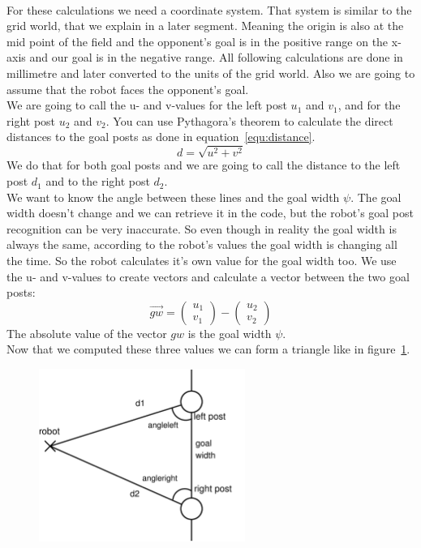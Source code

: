 \documentclass[lnicst,a4paper]{svmultln}
\begin{document}
\\
For these calculations we need a coordinate system. That system is similar to the grid world, that we explain in a later segment. Meaning the origin is also at the mid point of the field and the opponent's goal is in the positive range on the x-axis and our goal is in the negative range. All following calculations are done in millimetre and later converted to the units of the grid world. Also we are going to assume that the robot faces the opponent's goal. 
\\
We are going to call the u- and v-values for the left post \(u_{1}\) and \(v_{1}\), and for the right post \(u_{2}\) and \(v_{2}\). You can use Pythagora's theorem to calculate the direct distances to the goal posts as done in equation~\ref{equ:distance}.
\begin{equation}
	d = \sqrt{u^2+v^2}
	\label{equ:distance}
\end{equation}
We do that for both goal posts and we are going to call the distance to the left post \(d_{1}\) and to the right post \(d_{2}\). 
\\
We want to know the angle between these lines and the goal width \(\psi\). The goal width doesn't change and we can retrieve it in the code, but the robot's goal post recognition can be very inaccurate. So even though in reality the goal width is always the same, according to the robot's values the goal width is changing all the time. So the robot calculates it's own value for the goal width too. We use the u- and v-values to create vectors and calculate a vector between the two goal posts:
\begin{equation}
	\vec{gw}=\left(\begin{array}{c} u_{1} \\ v_{1} \end{array}\right) - \left(\begin{array}{c} u_{2} \\ v_{2} \end{array}\right)
\end{equation}
The absolute value of the vector \(gw\) is the goal width \(\psi\).
\\
Now that we computed these three values we can form a triangle like in figure~\ref{fig:triangle}.
\begin{figure}
 	\centerline{\includegraphics[width=0.6\textwidth]{triangle.pdf}}
	{\caption{}\label{fig:triangle}}
\end{figure}
\end{document}
